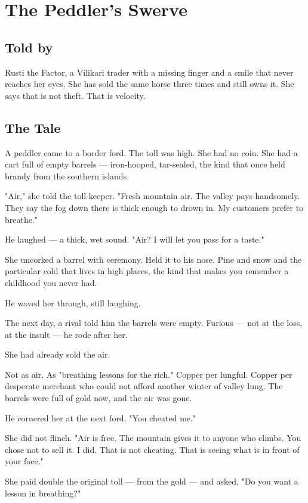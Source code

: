 \chapter{The Peddler's Swerve}

\section*{Told by}
Rusti the Factor, a Vilikari trader with a missing finger and a smile that never reaches her eyes. She has sold the same horse three times and still owns it. She says that is not theft. That is velocity.

\section*{The Tale}

A peddler came to a border ford. The toll was high. She had no coin. She had a cart full of empty barrels — iron-hooped, tar-sealed, the kind that once held brandy from the southern islands.

"Air," she told the toll-keeper. "Fresh mountain air. The valley pays handsomely. They say the fog down there is thick enough to drown in. My customers prefer to breathe."

He laughed — a thick, wet sound. "Air? I will let you pass for a taste."

She uncorked a barrel with ceremony. Held it to his nose. Pine and snow and the particular cold that lives in high places, the kind that makes you remember a childhood you never had.

He waved her through, still laughing.

The next day, a rival told him the barrels were empty. Furious — not at the loss, at the insult — he rode after her.

She had already sold the air.

Not as air. As "breathing lessons for the rich." Copper per lungful. Copper per desperate merchant who could not afford another winter of valley lung. The barrels were full of gold now, and the air was gone.

He cornered her at the next ford. "You cheated me."

She did not flinch. "Air is free. The mountain gives it to anyone who climbs. You chose not to sell it. I did. That is not cheating. That is seeing what is in front of your face."

She paid double the original toll — from the gold — and asked, "Do you want a lesson in breathing?"

